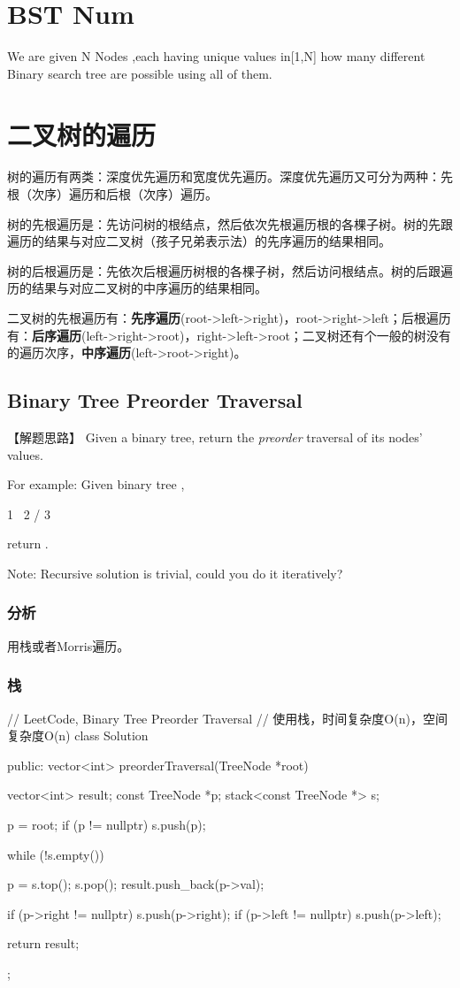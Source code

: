 \section{BST Num}
We are given N Nodes ,each having unique values in[1,N] how many different Binary search tree are possible using all of them.

\section{二叉树的遍历} %

树的遍历有两类：深度优先遍历和宽度优先遍历。深度优先遍历又可分为两种：先根（次序）遍历和后根（次序）遍历。

树的先根遍历是：先访问树的根结点，然后依次先根遍历根的各棵子树。树的先跟遍历的结果与对应二叉树（孩子兄弟表示法）的先序遍历的结果相同。

树的后根遍历是：先依次后根遍历树根的各棵子树，然后访问根结点。树的后跟遍历的结果与对应二叉树的中序遍历的结果相同。

二叉树的先根遍历有：\textbf{先序遍历}(root->left->right)，root->right->left；后根遍历有：\textbf{后序遍历}(left->right->root)，right->left->root；二叉树还有个一般的树没有的遍历次序，\textbf{中序遍历}(left->root->right)。


\subsection{Binary Tree Preorder Traversal}
\label{sec:binary-tree-preorder-traversal}


【解题思路】
Given a binary tree, return the \emph{preorder} traversal of its nodes' values.

For example:
Given binary tree ,
\begin{Code}
	1
	\
	2
	/
	3
\end{Code}
return \code{[1,2,3]}.

Note: Recursive solution is trivial, could you do it iteratively?


\subsubsection{分析}
用栈或者Morris遍历。


\subsubsection{栈}
\begin{Code}
	// LeetCode, Binary Tree Preorder Traversal
	// 使用栈，时间复杂度O(n)，空间复杂度O(n)
	class Solution {
		public:
		vector<int> preorderTraversal(TreeNode *root) {
			vector<int> result;
			const TreeNode *p;
			stack<const TreeNode *> s;
			
			p = root;
			if (p != nullptr) s.push(p);
			
			while (!s.empty()) {
				p = s.top();
				s.pop();
				result.push_back(p->val);
				
				if (p->right != nullptr) s.push(p->right);
				if (p->left != nullptr) s.push(p->left);
			}
			return result;
		}
	};
\end{Code}


